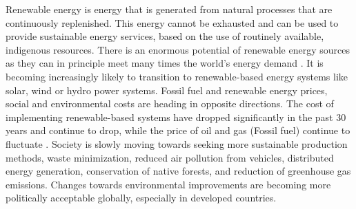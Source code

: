 Renewable energy is energy that is generated from natural processes that are continuously replenished. This energy cannot be exhausted and can be used to provide sustainable energy services, based on the use of routinely available, indigenous resources. There is an enormous potential of renewable energy sources as they can in principle meet many times the world’s energy demand \cite{herzog2001renewable}. It is becoming increasingly likely to transition to renewable-based energy systems like solar, wind or hydro power systems. Fossil fuel and renewable energy prices, social and environmental costs are heading in opposite directions. The cost of implementing renewable-based systems have dropped significantly in the past 30 years and continue to drop, while the price of oil and gas (Fossil fuel) continue to fluctuate \cite{herzog2001renewable}. Society is slowly moving towards seeking more sustainable production methods, waste minimization, reduced air pollution from vehicles, distributed energy generation, conservation of native forests, and reduction of greenhouse gas emissions. Changes towards environmental improvements are becoming more politically acceptable globally, especially in developed countries. 

